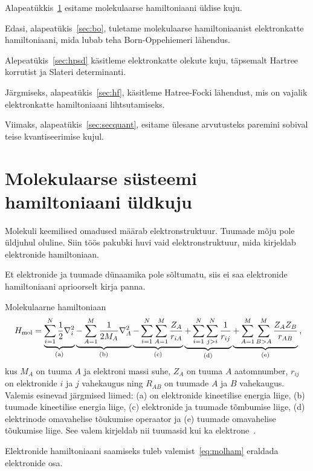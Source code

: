 \documentclass[12pt]{report}
\begin{document}
Alapeatükkis~\ref{sec:molham} esitame molekulaarse hamiltoniaani üldise kuju.

Edasi, alapeatükis~\ref{sec:bo}, tuletame molekulaarse hamiltoniaanist elektronkatte hamiltoniaani, mida lubab teha Born-Oppehiemeri lähendus.

Alepeatükis~\ref{sec:hpsd} käsitleme elektronkatte olekute kuju, täpsemalt Hartree korrutist ja Slateri determinanti.

Järgmiseks, alapeatükis~\ref{sec:hf}, käsitleme Hatree-Focki lähendust, mis on vajalik elektronkatte hamiltoniaani lihtsutamiseks.

Viimaks, alapeatükis~\ref{sec:secquant}, esitame ülesane arvutusteks paremini sobival teise kvantiseerimise kujul.

\section{Molekulaarse süsteemi hamiltoniaani üldkuju}\label{sec:molham}

Molekuli keemilised omadused määrab elektronstruktuur.
Tuumade mõju pole üldjuhul oluline.
Siin töös pakubki huvi vaid elektronstruktuur, mida kirjeldab elektronide hamiltoniaan.

Et elektronide ja tuumade dünaamika pole sõltumatu, siis ei saa elektronide hamiltoniaani aprioorselt kirja panna.

Molekulaarne hamiltoniaan
\begin{align}\label{eq:molham}
    H_\text{mol} = \underbrace{\sum_{i = 1}^N \frac{1}{2} \nabla_i^2}_\text{(a)}
    \underbrace{- \sum_{A = 1}^M \frac{1}{2 M_A} \nabla_A^2}_\text{(b)}
    \underbrace{- \sum_{i = 1}^N \sum_{A = 1}^M \frac{Z_A}{r_{iA}}}_\text{(c)}
    \underbrace{+ \sum_{i = 1}^N \sum_{j > i}^N \frac{1}{r_{ij}}}_\text{(d)}
    \underbrace{+ \sum_{A = 1}^M \sum_{B > A}^M \frac{Z_A Z_B}{r_{AB}}}_\text{(e)} \rlap{,}
\end{align}
kus \(M_A\) on tuuma \(A\) ja elektroni massi suhe, \(Z_A\) on tuuma \(A\) aatomnumber, \(r_{ij}\) on elektronide \(i\) ja \(j\) vahekaugus ning \(R_{AB}\) on tuumade \(A\) ja \(B\) vahekaugus.
Valemis esinevad järgmised liimed: (a) on elektronide kineetilise energia liige, (b) tuumade kineetilise energia liige, (c) elektronide ja tuumade tõmbumise liige, (d) elektrinode omavahelise tõukumise operaator ja (e) tuumade omavahelise tõukumise liige.
See valem kirjeldab nii tuumasid kui ka elektrone~\cite{szabo+ostlund}.

Elektronide hamiltoniaani saamiseks tuleb valemist~\eqref{eq:molham} eraldada elektronide osa.
\end{document}
